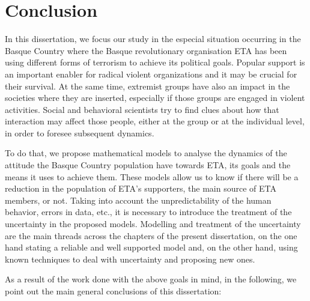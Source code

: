 \chapter{Conclusion}\label{conclusion}

In this dissertation, we focus our study in the especial situation occurring in the Basque Country where the Basque revolutionary organisation ETA has been using different forms of terrorism to achieve its political goals. Popular support is an important enabler for radical violent organizations and it may be crucial for their survival. At the same time, extremist groups have also an impact in the societies where they are inserted, especially if those groups are engaged in violent activities. Social and behavioral scientists try to find clues about how that interaction may affect those people, either at the group or at the individual level, in order to foresee subsequent dynamics. 

To do that, we propose mathematical models to analyse the dynamics of the attitude the Basque Country population have towards ETA, its goals and the means it uses to achieve them. These models allow us to know if there will be a reduction in the population of ETA's supporters, the main source of ETA members, or not. Taking into account the unpredictability of the human behavior, errors in data, etc., it is necessary to introduce the treatment of the uncertainty in the proposed models. Modelling and treatment of the uncertainty are the main threads across the chapters of the present dissertation, on the one hand stating a reliable and well supported model and, on the other hand, using known techniques to deal with uncertainty and proposing new ones. 

As a result of the work done with the above goals in mind, in the following, we point out the main general conclusions of this dissertation:

